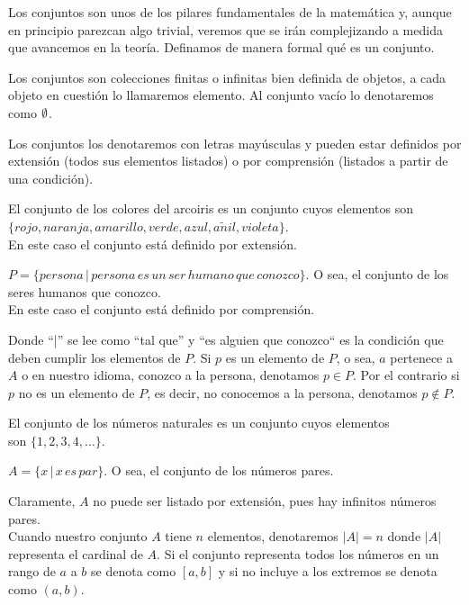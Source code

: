Los conjuntos son unos de los pilares fundamentales de la matemática y, aunque en principio parezcan algo trivial, veremos que se irán complejizando a medida que avancemos en la teoría.
Definamos de manera formal qué es un conjunto.

\begin{definition}
    Los conjuntos son colecciones finitas o infinitas bien definida de objetos, a cada objeto en cuestión lo llamaremos elemento. 
    Al conjunto vacío lo denotaremos como $\emptyset$.
\end{definition}

Los conjuntos los denotaremos con letras mayúsculas y pueden estar definidos por extensión (todos sus elementos listados) o por comprensión (listados a partir de una condición). 

\begin{eg}
    El conjunto de los colores del arcoiris es un conjunto cuyos elementos son $\{ rojo, naranja, amarillo, verde, azul, a\tilde{n}il, violeta \}$.\\
    En este caso el conjunto está definido por extensión.
\end{eg}

\begin{eg}
    $P = \{persona \, | \, persona \, es \, un \, ser \, humano \, que \, conozco\}$. O sea, el conjunto de los seres humanos que conozco.\\
    En este caso el conjunto está definido por comprensión.
\end{eg}

Donde ``|'' se lee como ``tal que'' y ``es alguien que conozco`` es la condición 
que deben cumplir los elementos de $P$.
Si $p$ es un elemento de $P$, o sea, $a$ pertenece a $A$ o en nuestro idioma, conozco a la persona, denotamos $p \in P$.
Por el contrario si $p$ no es un elemento de $P$, es decir, no conocemos a la persona, denotamos $p \notin P$.\\

\begin{eg}
    El conjunto de los números naturales es un conjunto cuyos elementos\\
    son $\{ 1, 2, 3, 4, \ldots \}$.
\end{eg}

\begin{eg}
    $A = \{x \, | \, x \, es \, par\}$. O sea, el conjunto de los números pares.
\end{eg}

Claramente, $A$ no puede ser listado por extensión, pues hay infinitos números pares.\\
Cuando nuestro conjunto $A$ tiene $n$ elementos, denotaremos $|A| = n$ donde $|A|$ representa el cardinal de $A$.
Si el conjunto representa todos los números en un rango de $a$ a $b$ se denota como $[a, b]$ y si no incluye a los extremos se denota como $(a, b)$.

